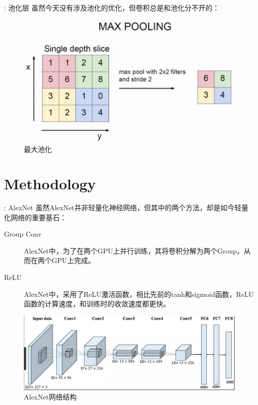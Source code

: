 \begin{frame}{\titleprefix: 池化层}
	虽然今天没有涉及池化的优化，但卷积总是和池化分不开的：
	\begin{figure}
		\centering
		\includegraphics[width=0.7\linewidth]{Images/pool_1}
		\caption{最大池化}
		\label{fig:pool1}
	\end{figure}
\end{frame}

\section{Methodology}

\begin{frame}{\titleprefix: AlexNet}
	虽然AlexNet并非轻量化神经网络，但其中的两个方法，却是如今轻量化网络的重要基石：
	\begin{description}
		\item[Group Conv] AlexNet中，为了在两个GPU上并行训练，其将卷积分解为两个Group，从而在两个GPU上完成。
		\item[ReLU] AlexNet中，采用了ReLU激活函数，相比先前的tanh和sigmoid函数，ReLU函数的计算速度，和训练时的收敛速度都更快。
	\end{description}
\begin{figure}
	\centering
	\includegraphics[width=0.7\linewidth]{Images/alexnet_1}
	\caption{AlexNet网络结构}
	\label{fig:alexnet1}
\end{figure}

\end{frame}

